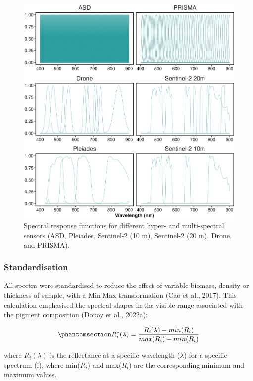 \documentclass[
  letterpaper,
  11pt,
  english,
  singlespacing,
  headsepline]{MastersDoctoralThesis}
\begin{document}
\begin{spacing}{1.5}
\begin{figure}
{\includegraphics[width=0.95\linewidth,height=\textheight,keepaspectratio]{Chapter2/Figs/Figure3_Bede.jpg}

}

\caption{\label{fig-SpectraDegFIG}Spectral response functions for
different hyper- and multi-spectral sensors (ASD, Pleiades, Sentinel-2
(10 m), Sentinel-2 (20 m), Drone, and PRISMA).}

\end{figure}%

\subsubsection{Standardisation}\label{standardisation}

All spectra were standardised to reduce the effect of variable biomass,
density or thickness of sample, with a Min-Max transformation (Cao et
al., 2017). This calculation emphasised the spectral shapes in the
visible range associated with the pigment composition (Douay et al.,
2022a):

\begin{equation}\phantomsection\label{eq-stdspectra}{ R_{i}^*(\lambda) = \frac{R_{i}(\lambda)-min(R_{i}) }{max(R_{i})-min(R_{i}) }}\end{equation}

where \(R_{i}(\lambda)\) is the reflectance at a specific wavelength
(\(\lambda\)) for a specific spectrum (i), where min(\(R_{i}\)) and
max(\(R_{i}\)) are the corresponding minimum and maximum values.


\end{spacing}
\end{document}

